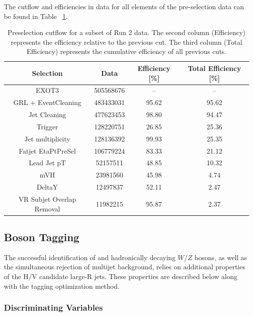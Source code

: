 The cutflow and efficiencies in data for all elements of the pre-selection data can be found in Table ~\ref{tab:data_cutflow}.

\begin{table}[htbp!]
\normalsize
\centering
\begin{tabular}{c||ccc}
    Selection & Data & Efficiency [\%] & Total Efficiency [\%] \\ \hline
    EXOT3                     & 505568676 & --    & -- \\ \hline
    GRL + EventCleaning       & 483433031 & 95.62 & 95.62 \\ \hline
    Jet Cleaning              & 477623453 & 98.80 & 94.47 \\ \hline
    Trigger                   & 128220751 & 26.85 & 25.36 \\ \hline
    Jet multiplicity          & 128136392 & 99.93 & 25.35 \\ \hline
    Fatjet EtaPtPreSel        & 106779224 & 83.33 & 21.12 \\ \hline
    Lead Jet pT               & 52157511  & 48.85 & 10.32 \\ \hline
    mVH                       & 23981560  & 45.98 & 4.74 \\ \hline
    DeltaY                    & 12497837  & 52.11 & 2.47 \\ \hline
    VR Subjet Overlap Removal & 11982215  & 95.87 & 2.37 \\
\end{tabular}
\caption{
    Preselection cutflow for a subset of Run 2 data.
    The second column (Efficiency) represents the efficiency relative to the previous cut.
    The third column (Total Efficiency) represents the cumulative efficiency of all previous cuts.
}
\label{tab:data_cutflow}
\end{table}
 
\subsection{Boson Tagging}

The successful identification of \Hbb and hadronically decaying $W$/$Z$ bosons, as well as the simultaneous rejection of multijet background, relies on additional properties of the H/V candidate large-R jets. These properties are described below along with the tagging optimization method.

\subsubsection{Discriminating Variables}

